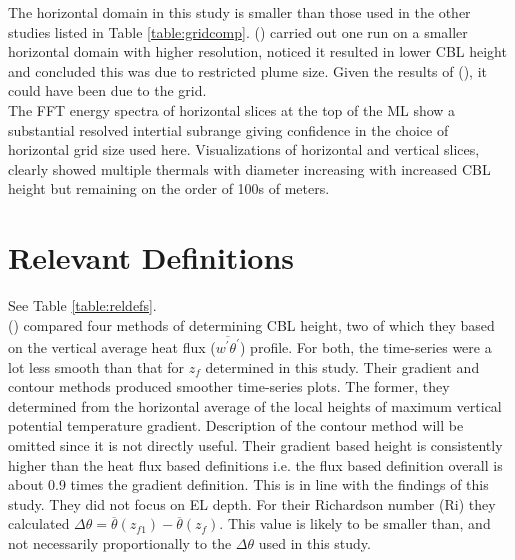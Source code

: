 The horizontal domain in this study is smaller than those used in the other studies listed in Table \ref{table:gridcomp}. \citeauthor{SullMoengStev} (\citeyear{SullMoengStev}) carried out one run on a smaller horizontal domain with higher resolution, noticed it resulted in lower \acs{CBL} height and concluded this was due to restricted plume size. Given the results of \citeauthor{SullPat} (\citeyear{SullPat}), it could have been due to the grid.\\   

The \acs{FFT} energy spectra of horizontal slices at the top of the \acs{ML} show a substantial resolved intertial subrange giving confidence in the choice of horizontal grid size used here.  Visualizations of horizontal and vertical slices, clearly showed multiple thermals with diameter increasing with increased \acs{CBL} height but remaining on the order of 100s of meters. \\             




\section{Relevant Definitions}

\FloatBarrier

See Table \ref{table:reldefs}.\\

\citeauthor{SullMoengStev} (\cite{SullMoengStev}) compared four methods of determining \acs{CBL} height, two of which they based on the vertical average heat flux ($\overline{w^{'}\theta^{'}}$) profile. For both, the time-series were a lot less smooth than that for $z_{f}$ determined in this study.  Their gradient and contour methods produced smoother time-series plots.  The former, they determined from the horizontal average of the local heights of maximum vertical potential temperature gradient.  Description of the contour method will be omitted since it is not directly useful. Their gradient based height is consistently higher than the heat flux based definitions i.e. the flux based definition overall is about 0.9 times the gradient definition. This is in line with the findings of this study. They did not focus on \acs{EL} depth. For their Richardson number (\acs{Ri}) they calculated $\Delta \theta = \overline{\theta}(z_{f1})-\overline{\theta}(z_{f})$.  This value is likely to be smaller than, and not necessarily proportionally to the $\Delta \theta$ used in this study. \\


